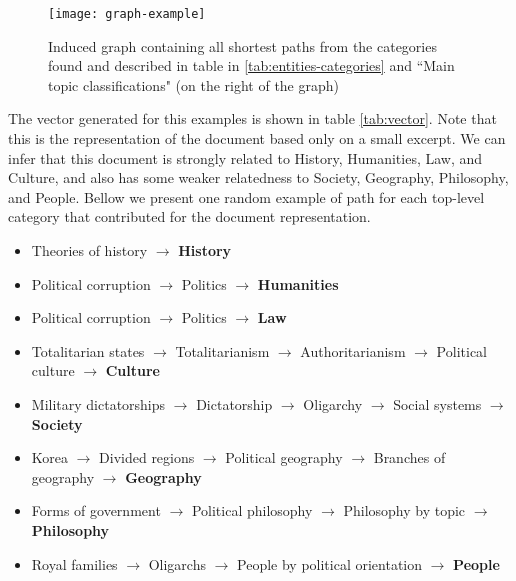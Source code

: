 
\begin{figure}[H]
  \texttt{[image: graph-example]}
  \caption{Induced graph containing all shortest paths from the categories found and described in table in \ref{tab:entities-categories} and ``Main topic classifications" (on the right of the graph)}
  \label{fig:graph-example}
\end{figure}


The vector generated for this examples is shown in table \ref{tab:vector}. Note that this is the representation of the document based only on a small excerpt. 
We can infer that this document is strongly related to History, Humanities, Law, and Culture, and also has some weaker relatedness to Society, Geography, Philosophy, and People. Bellow we present one random example of path for each top-level category that contributed for the document representation.


\begin{itemize}

\item Theories of history $\rightarrow$ \textbf{History} 

\item Political corruption $\rightarrow$ Politics $\rightarrow$ \textbf{Humanities}

\item Political corruption $\rightarrow$ Politics $\rightarrow$ \textbf{Law} 


\item Totalitarian states $\rightarrow$ Totalitarianism $\rightarrow$ Authoritarianism $\rightarrow$ Political culture $\rightarrow$ \textbf{Culture}


\item Military dictatorships $\rightarrow$ Dictatorship $\rightarrow$ Oligarchy $\rightarrow$ Social systems $\rightarrow$ \textbf{Society} 


\item 
Korea $\rightarrow$ Divided regions $\rightarrow$ Political geography $\rightarrow$ Branches of geography $\rightarrow$ \textbf{Geography}


\item Forms of government $\rightarrow$ Political philosophy $\rightarrow$ Philosophy by topic $\rightarrow$ \textbf{Philosophy}

\item Royal families $\rightarrow$ Oligarchs $\rightarrow$ People by political orientation $\rightarrow$ \textbf{People} 


\end{itemize}


